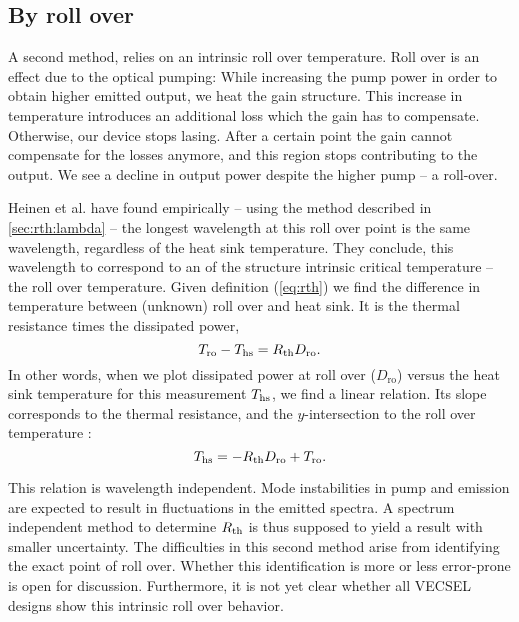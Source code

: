 \subsection{By roll over}
\label{sec:rth:trollover}

A second method,
relies on an intrinsic roll over temperature.
Roll over is an effect due to the optical pumping:
While increasing the pump power
in order to obtain higher emitted output,
we heat the gain structure.
This increase in temperature
introduces an additional loss
which the gain
has to compensate.
Otherwise,
our device stops lasing.
After a certain point
the gain cannot compensate for the losses anymore,
and this region stops contributing
to the output.
We see
a decline
in output power
despite the higher pump --
a roll-over.

Heinen et al. \cite{Heinen2012}
have found empirically --
using the method described in \ref{sec:rth:lambda} --
the longest wavelength
at this roll over point
is the same wavelength,
regardless of the heat sink temperature.
They conclude,
this wavelength to correspond
to an of the structure intrinsic
critical temperature --
the roll over temperature.
Given definition (\ref{eq:rth})
we find
the difference in temperature
between (unknown) roll over and heat sink.
It is
the thermal resistance
times the dissipated power,
\begin{equation}
T_\mathrm{ro} - T_\mathrm{hs} = R_\mathrm{th} D_\mathrm{ro}.
\end{equation}
In other words,
when we plot
dissipated power at roll over ($D_\mathrm{ro}$)
versus the heat sink temperature
for this measurement $T_\mathrm{hs}$,
we find a linear relation.
Its slope corresponds
to the thermal resistance,
and the $y$-intersection
to the roll over temperature \cite{Heinen2012}:
\begin{equation}
T_\mathrm{hs} = -R_\mathrm{th} D_\mathrm{ro} + T_\mathrm{ro}.
\end{equation}

This relation is wavelength independent.
Mode instabilities in pump and emission
are expected to result in fluctuations
in the emitted spectra.
A spectrum independent method
to determine $R_\mathrm{th}$ is thus supposed to
yield a result with smaller uncertainty.
The difficulties in this second method
arise from identifying
the exact point of roll over.
Whether this identification
is more or less error-prone
is open for discussion.
Furthermore,
it is not yet clear
whether all VECSEL designs
show this intrinsic roll over behavior.